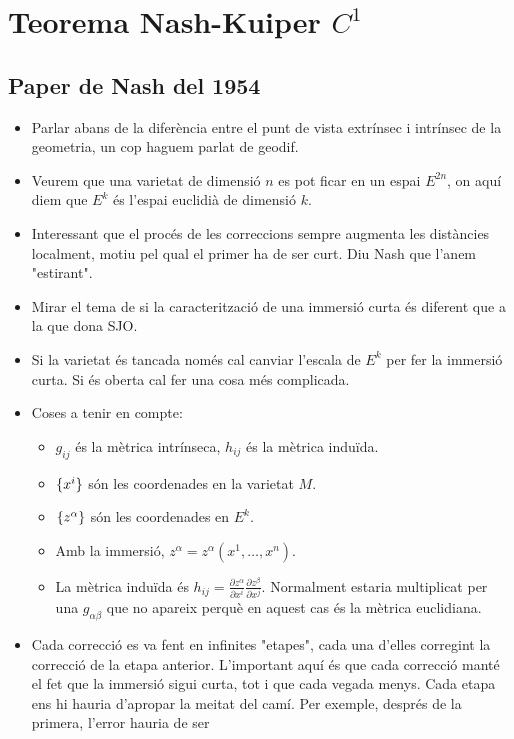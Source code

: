 \chapter{Teorema Nash-Kuiper $C^1$}
\section{Paper de Nash del 1954}
{
\color{blue}
\begin{itemize}
    \item Parlar abans de la diferència entre el punt de vista extrínsec i intrínsec de la geometria, un cop haguem parlat de geodif. 
    \item Veurem que una varietat de dimensió $n$ es pot ficar en un espai $E^{2n}$, on aquí diem que $E^k$ és l'espai euclidià de dimensió $k$.
    \item Interessant que el procés de les correccions sempre augmenta les distàncies localment, motiu pel qual el primer ha de ser curt. Diu Nash que l'anem "estirant".
    \item Mirar el tema de si la caracterització de una immersió curta és diferent que a la que dona SJO.
    \item Si la varietat és tancada només cal canviar l'escala de $E^k$ per fer la immersió curta. Si és oberta cal fer una cosa més complicada.
    \item Coses a tenir en compte:
        \begin{itemize}
            \item $g_{ij}$ és la mètrica intrínseca, $h_{ij}$ és la mètrica induïda.
            \item $\{x^i\}$ són les coordenades en la varietat $M$.
            \item $\{z^\alpha\}$ són les coordenades en $E^k$.
            \item Amb la immersió, $z^\alpha = z^\alpha(x^1, \dots, x^n)$.
            \item La mètrica induïda és $h_{ij} = \frac{\partial z^\alpha}{\partial x^i}\frac{\partial z^\beta}{\partial x^j}$. Normalment estaria multiplicat per una $g_{\alpha\beta}$ que no apareix perquè en aquest cas és la mètrica euclidiana.
        \end{itemize}
    \item Cada correcció es va fent en infinites "etapes", cada una d'elles corregint la correcció de la etapa anterior. L'important aquí és que cada correcció manté el fet que la immersió sigui curta, tot i que cada vegada menys. Cada etapa ens hi hauria d'apropar la meitat del camí. Per exemple, després de la primera, l'error hauria de ser

\end{itemize}}
